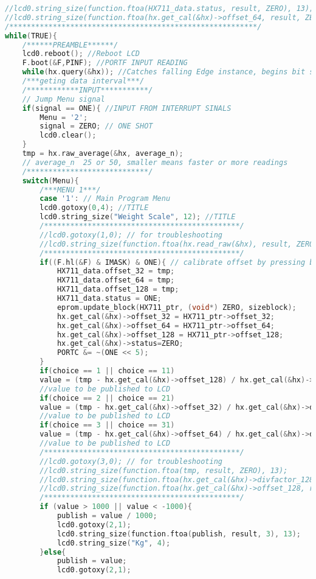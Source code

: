 \begin{lstlisting}[language=C]
//lcd0.string_size(function.ftoa(HX711_data.status, result, ZERO), 13);
//lcd0.string_size(function.ftoa(hx.get_cal(&hx)->offset_64, result, ZERO), 13);
/*********************************************************/
while(TRUE){
	/******PREAMBLE******/
	lcd0.reboot(); //Reboot LCD
	F.boot(&F,PINF); //PORTF INPUT READING
	while(hx.query(&hx)); //Catches falling Edge instance, begins bit shifting.
	/***geting data interval***/
	/************INPUT***********/
	// Jump Menu signal
	if(signal == ONE){ //INPUT FROM INTERRUPT SINALS
		Menu = '2';
		signal = ZERO; // ONE SHOT
		lcd0.clear();
	}
	tmp = hx.raw_average(&hx, average_n);
	// average_n  25 or 50, smaller means faster or more readings
	/****************************/
	switch(Menu){
		/***MENU 1***/
		case '1': // Main Program Menu
		lcd0.gotoxy(0,4); //TITLE
		lcd0.string_size("Weight Scale", 12); //TITLE
		/*********************************************/
		//lcd0.gotoxy(1,0); // for troubleshooting
		//lcd0.string_size(function.ftoa(hx.read_raw(&hx), result, ZERO), 13);
		/*********************************************/
		if((F.hl(&F) & IMASK) & ONE){ // calibrate offset by pressing button 1
			HX711_data.offset_32 = tmp;
			HX711_data.offset_64 = tmp;
			HX711_data.offset_128 = tmp;
			HX711_data.status = ONE;
			eprom.update_block(HX711_ptr, (void*) ZERO, sizeblock);
			hx.get_cal(&hx)->offset_32 = HX711_ptr->offset_32;
			hx.get_cal(&hx)->offset_64 = HX711_ptr->offset_64;
			hx.get_cal(&hx)->offset_128 = HX711_ptr->offset_128;
			hx.get_cal(&hx)->status=ZERO;
			PORTC &= ~(ONE << 5);
		}
		if(choice == 1 || choice == 11)
		value = (tmp - hx.get_cal(&hx)->offset_128) / hx.get_cal(&hx)->divfactor_128;
		//value to be published to LCD
		if(choice == 2 || choice == 21)
		value = (tmp - hx.get_cal(&hx)->offset_32) / hx.get_cal(&hx)->divfactor_32;
		//value to be published to LCD
		if(choice == 3 || choice == 31)
		value = (tmp - hx.get_cal(&hx)->offset_64) / hx.get_cal(&hx)->divfactor_64;
		//value to be published to LCD
		/*********************************************/
		//lcd0.gotoxy(3,0); // for troubleshooting
		//lcd0.string_size(function.ftoa(tmp, result, ZERO), 13);
		//lcd0.string_size(function.ftoa(hx.get_cal(&hx)->divfactor_128, result, ZERO), 13);
		//lcd0.string_size(function.ftoa(hx.get_cal(&hx)->offset_128, result, ZERO), 13);
		/*********************************************/
		if (value > 1000 || value < -1000){
			publish = value / 1000;
			lcd0.gotoxy(2,1);
			lcd0.string_size(function.ftoa(publish, result, 3), 13);
			lcd0.string_size("Kg", 4);
		}else{
			publish = value;
			lcd0.gotoxy(2,1);

\end{lstlisting}
